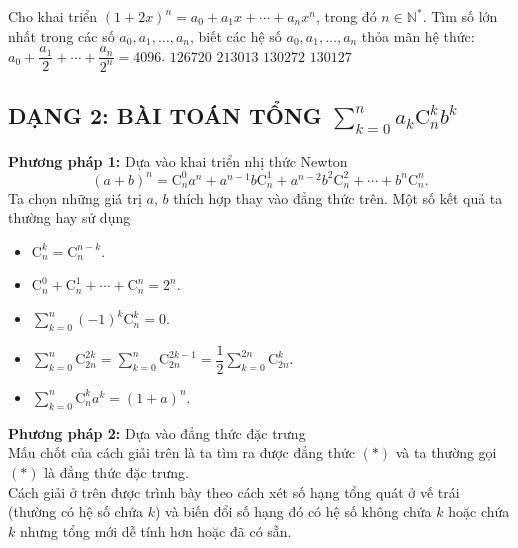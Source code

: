 \begin{ex}
	Cho khai triển ${(1 + 2x)^n} = {a_0} + {a_1}x + \cdots + {a_n}{x^n}$, trong đó $n\in\mathbb{N}^*$. Tìm số lớn nhất trong các số ${a_0},{a_1},\ldots,{a_n}$, biết các hệ số ${a_0},{a_1},\ldots,{a_n}$ thỏa mãn hệ thức: ${a_0} + \dfrac{{{a_1}}}{2} + \cdots + \dfrac{{{a_n}}}{{{2^n}}} = 4096$.
	\choice
	{\True $126720$}
	{$213013$}
	{$130272$}
	{$130127$}
\end{ex}

\subsection{DẠNG 2: BÀI TOÁN TỔNG $\displaystyle\sum\limits_{k=0}^{n}a_k\mathrm{C}_n^kb^k$}
\textbf{Phương pháp 1:} Dựa vào khai triển nhị thức Newton
$$(a+b)^n=\mathrm{C}_n^0a^n+a^{n-1}b\mathrm{C}_n^1+a^{n-2}b^2\mathrm{C}_n^2+\cdots+b^n\mathrm{C}_n^n.$$
Ta chọn những giá trị $a$, $b$ thích hợp thay vào đẳng thức trên. Một số kết quả ta thường hay sử dụng
\begin{itemize}
	\item $\mathrm{C}_n^k=\mathrm{C}_n^{n-k}$.
	\item $\mathrm{C}_n^0+\mathrm{C}_n^1+\cdots+\mathrm{C}_n^n=2^n$.
	\item $\displaystyle\sum\limits_{k=0}^{n}(-1)^k\mathrm{C}_n^k=0$.
	\item $\displaystyle\sum\limits_{k=0}^{n}\mathrm{C}_{2n}^{2k}=\displaystyle\sum\limits_{k=0}^{n}\mathrm{C}_{2n}^{2k-1}=\dfrac{1}{2}\displaystyle\sum\limits_{k=0}^{2n}\mathrm{C}_{2n}^k$.
	\item $\displaystyle\sum\limits_{k=0}^{n}\mathrm{C}_n^ka^k=(1+a)^n$.
\end{itemize}
\textbf{Phương pháp 2:} Dựa vào đẳng thức đặc trưng\\
Mấu chốt của cách giải trên là ta tìm ra được đẳng thức $(*)$ và ta thường gọi $(*)$ là đẳng thức đặc trưng.\\
Cách giải ở trên được trình bày theo cách xét số hạng tổng quát ở vế trái (thường có hệ số chứa $k$) và biến đổi số hạng đó có hệ số không chứa $k$ hoặc chứa $k$ nhưng tổng mới dễ tính hơn hoặc đã có sẵn.


